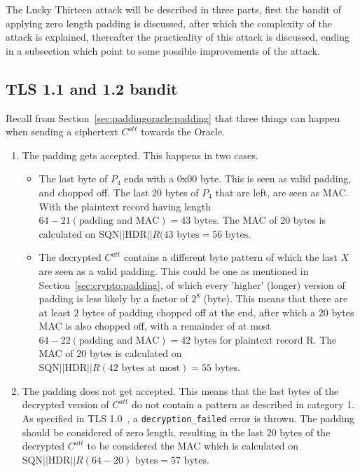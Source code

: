 \documentclass[10pt,conference,a4paper]{IEEEtran}
\begin{document}
The Lucky Thirteen attack will be described in three parts, first the bandit of applying zero length padding is discussed, after which the complexity of the attack is explained, thereafter the practicality of this attack is discussed, ending in a subsection which point to some possible improvements of the attack.

\subsection{TLS 1.1 and 1.2 bandit}
\label{sec:lucky:bandit}
Recall from Section~\ref{sec:paddingoracle:padding} that three things can happen when sending a ciphertext $C^{att}$ towards the Oracle.
\begin{enumerate}
  \item The padding gets accepted. This happens in two cases.
	\begin{itemize}
		\item The last byte of $P_4$ ends with a $0\text{x}00$ byte. This is seen as valid padding, and chopped off. The last $20$ bytes of $P_4$ that are left, are seen as MAC. With the plaintext record having length $64 - 21 (\text{padding and MAC}) = 43 \text{ bytes}$. The MAC of $20$ bytes is calculated on $\text{SQN} || \text{HDR} || R (43 \text{ bytes} = 56\text{ bytes}$.
		\item The decrypted $C^{att}$ contains a different byte pattern of which the last $X$ are seen as a valid padding. This could be one as mentioned in Section~\ref{sec:crypto:padding}, of which every 'higher' (longer) version of padding is less likely by a factor of $2^8$ (byte). This means that there are at least $2$ bytes of padding chopped off at the end, after which a $20$ bytes MAC is also chopped off, with a remainder of at most $64 - 22 (\text{padding and MAC}) = 42 \text{ bytes}$ for plaintext record R. The MAC of $20$ bytes is calculated on $\text{SQN} || \text{HDR} || R (42 \text{ bytes at most}) = 55\text{ bytes}$.
	\end{itemize}
  \item The padding does not get accepted. This means that the last bytes of the decrypted version of $C^{att}$ do not contain a pattern as described in category 1. As specified in TLS 1.0~\cite{dierks1999rfc}, a \texttt{decryption\_failed} error is thrown. The padding should be considered of zero length, resulting in the last $20$ bytes of the decrypted $C^{att}$ to be considered the MAC which is calculated on $\text{SQN} || \text{HDR} || R (64 - 20) \text{ bytes} = 57\text{ bytes}$.
\end{enumerate}
\end{document}
